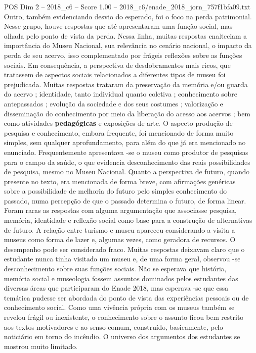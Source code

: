 \begin{textsample}{POS Dim 2 – 2018\_c6 – Score 1.00 – 2018\_c6/enade\_2018\_jorn\_757f1bfa09.txt}
Outro, também evidenciando desvio do esperado, foi o foco na perda patrimonial.
Nesse grupo, houve respostas que até apresentaram uma função social, mas olhada pelo ponto de vista da perda.
Nessa linha, muitas respostas enalteciam a importância do Museu Nacional, sua relevância no cenário nacional, o impacto da perda de seu acervo, isso complementado por frágeis reflexões sobre as funções sociais.
Em consequência, a perspectiva de desdobramentos mais ricos, que tratassem de aspectos sociais relacionados a diferentes tipos de museu foi prejudicada.
Muitas respostas trataram da preservação da memória e/ou guarda do acervo ; identidade, tanto individual quanto coletiva ; conhecimento sobre antepassados ; evolução da sociedade e dos seus costumes ; valorização e disseminação do conhecimento por meio da liberação do acesso aos acervos ; bem como atividades \textbf{pedagógicas} e exposições de arte.
O aspecto produção de pesquisa e conhecimento, embora frequente, foi mencionado de forma muito simples, sem qualquer aprofundamento, para além do que já era mencionado no enunciado.
Frequentemente apresentava -se o museu como produtor de pesquisas para o campo da saúde, o que evidencia desconhecimento das reais possibilidades de pesquisa, mesmo no Museu Nacional.
Quanto a perspectiva de futuro, quando presente no texto, era mencionada de forma breve, com afirmações genéricas sobre a possibilidade de melhoria do futuro pelo simples conhecimento do passado, numa percepção de que o passado determina o futuro, de forma linear.
Foram raras as respostas com alguma argumentação que associasse pesquisa, memória, identidade e reflexão social como base para a construção de alternativas de futuro.
A relação entre turismo e museu apareceu considerando a visita a museus como forma de lazer e, algumas vezes, como geradora de recursos.
O desempenho pode ser considerado fraco.
Muitas respostas deixavam claro que o estudante nunca tinha visitado um museu e, de uma forma geral, observou -se desconhecimento sobre suas funções sociais.
Não se esperava que história, memória social e museologia fossem assuntos dominados pelos estudantes das diversas áreas que participaram do Enade 2018, mas esperava -se que essa temática pudesse ser abordada do ponto de vista das experiências pessoais ou de conhecimento social.
Como uma vivência própria com os museus também se revelou frágil ou inexistente, o conhecimento sobre o assunto ficou bem restrito aos textos motivadores e ao senso comum, construído, basicamente, pelo noticiário em torno do incêndio.
O universo dos argumentos dos estudantes se mostrou muito limitado.

\end{textsample}
